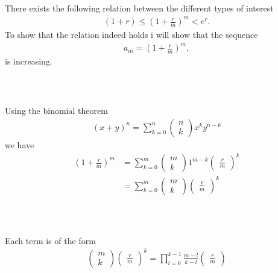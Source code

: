 \documentclass{beamer}
\numberwithin{equation}{section}
\begin{document}
\begin{frame}\frametitle{{\normalsize \secname} \\ {\large \subsecname}}
    There exists the following relation between the different types of interest
    \begin{align}
        (1 + r) \leq \left(1 + \frac{r}{m}\right)^m < e^r.
    \end{align}
    To show that the relation indeed holds i will show that the sequence
    \begin{align}
        a_m = \left(1 + \frac{r}{m}\right)^m,
    \end{align}
    is increasing.
\end{frame}

\begin{frame}\frametitle{{\normalsize \secname} \\ {\large \subsecname}}
    Using the binomial theorem
    \begin{align*}
        (x+y)^n = \sum_{k=0}^n \begin{pmatrix} n \\ k \end{pmatrix} x^k y^{n-k}
    \end{align*}
    we have 
    \begin{align*}
        \left( 1 + \frac{r}{m} \right)^m &= \sum_{k=0}^m \begin{pmatrix} m \\ k \end{pmatrix} 1^{m-k}\begin{pmatrix} \frac{r}{m} \end{pmatrix}^k\\
        &= \sum_{k=0}^m \begin{pmatrix} m \\ k \end{pmatrix} \begin{pmatrix} \frac{r}{m} \end{pmatrix}^k
    \end{align*}
\end{frame}

\begin{frame}\frametitle{{\normalsize \secname} \\ {\large \subsecname}}
    Each term is of the form
    \begin{align*}
        \begin{pmatrix} m \\ k \end{pmatrix}\begin{pmatrix} \frac{r}{m} \end{pmatrix}^k = \prod_{l=0}^{k-1} \frac{m-l}{k - l} \begin{pmatrix} \frac{r}{m} \end{pmatrix}
    \end{align*}
\end{frame}
\end{document}
